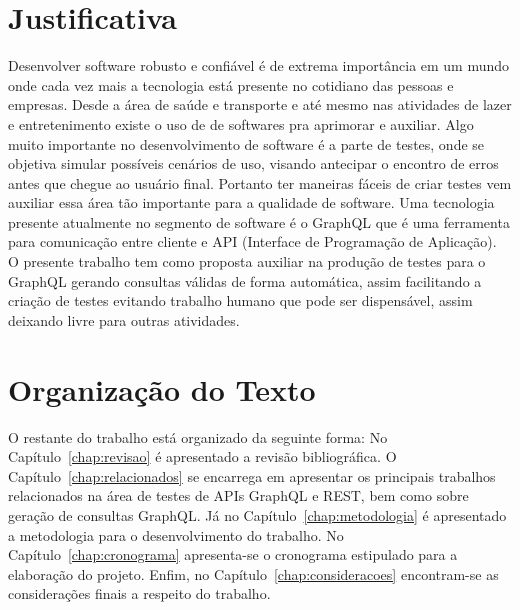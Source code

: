 \section{Justificativa}
Desenvolver software robusto e confiável é de extrema importância em um mundo onde cada vez mais a tecnologia está presente no cotidiano das pessoas e empresas. Desde a área de saúde e transporte e até mesmo nas atividades de lazer e entretenimento existe o uso de de softwares pra aprimorar e auxiliar. Algo muito importante no desenvolvimento de software é a parte de testes, onde se objetiva simular possíveis cenários de uso, visando antecipar o encontro de erros antes que chegue ao usuário final. Portanto ter maneiras fáceis de criar testes vem auxiliar essa área tão importante para a qualidade de software. Uma tecnologia presente atualmente no segmento de software é o GraphQL que é uma ferramenta para comunicação entre cliente e API (Interface de Programação de Aplicação). O presente trabalho tem como proposta auxiliar na produção de testes para o GraphQL gerando consultas válidas de forma automática, assim facilitando a criação de testes evitando trabalho humano que pode ser dispensável, assim deixando livre para outras atividades.

\section{Organização do Texto}
O restante do trabalho está organizado da seguinte forma: No Capítulo~\ref{chap:revisao} é apresentado a revisão bibliográfica. O Capítulo~\ref{chap:relacionados} se encarrega em apresentar os principais trabalhos relacionados na área de testes de APIs GraphQL e REST, bem como sobre geração de consultas GraphQL. Já no Capítulo~\ref{chap:metodologia} é apresentado a metodologia para o desenvolvimento do trabalho. No Capítulo~\ref{chap:cronograma} apresenta-se o cronograma estipulado para a elaboração do projeto. Enfim, no Capítulo~\ref{chap:consideracoes} encontram-se as considerações finais a respeito do trabalho.
